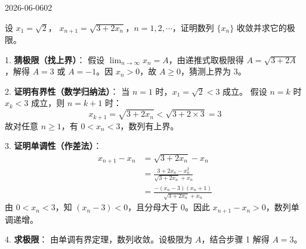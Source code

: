\begin{mistake}{2026-06-06}{02}

\begin{problemcontent}
设 \(x_1 = \sqrt{2}\)， \(x_{n+1} = \sqrt{3 + 2x_n}\)，\(n=1,2,\cdots\)，证明数列 \(\{x_n\}\) 收敛并求它的极限。
\end{problemcontent}

\begin{solutioncontent}
1. \textbf{猜极限（找上界）}：
假设 \(\lim_{n\to\infty} x_n = A\)，由递推式取极限得 \( A = \sqrt{3 + 2A} \)，解得 \(A = 3\) 或 \(A = -1\)。因 \(x_n > 0\)，故 \(A \ge 0\)，猜测上界为 3。

2. \textbf{证明有界性（数学归纳法）}：
当 \(n=1\) 时，\(x_1 = \sqrt{2} < 3\) 成立。
假设 \(n=k\) 时 \(x_k < 3\) 成立，则 \(n=k+1\) 时：
\[ x_{k+1} = \sqrt{3 + 2x_n} < \sqrt{3 + 2 \times 3} = 3 \]
故对任意 \(n \ge 1\)，有 \(0 < x_n < 3\)，数列有上界。

3. \textbf{证明单调性（作差法）}：
\[
\begin{aligned}
x_{n+1} - x_n &= \sqrt{3 + 2x_n} - x_n \\
&= \frac{3 + 2x_n - x_n^2}{\sqrt{3 + 2x_n} + x_n} \\
&= \frac{-(x_n - 3)(x_n + 1)}{\sqrt{3 + 2x_n} + x_n}
\end{aligned}
\]
由 \(0 < x_n < 3\)，知 \((x_n - 3) < 0\)，且分母大于 0。因此 \(x_{n+1} - x_n > 0\)，数列单调递增。

4. \textbf{求极限}：
由单调有界定理，数列收敛。设极限为 \(A\)，结合步骤 1 解得 \(A = 3\)。
\end{solutioncontent}


\end{mistake}
